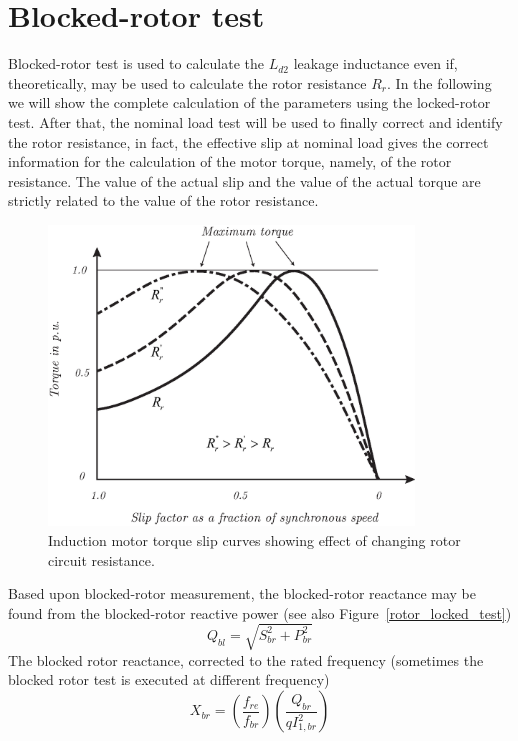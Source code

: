 \documentclass[11pt,a4paper,oneside]{book}
\numberwithin{equation}{section}
\theoremstyle{it}
\theoremstyle{definition}
\begin{document}
\section{Blocked-rotor test}
Blocked-rotor test is used to calculate the $L_{d2}$ leakage inductance even if, theoretically, may be used to calculate the rotor resistance $R_r$. 
In the following we will show the complete calculation of the parameters using the locked-rotor test. After that,  the nominal load test will be used to finally correct and identify the rotor resistance, in fact, the effective slip at nominal load gives the correct information for the calculation of the motor torque, namely, of the rotor resistance. The value of the actual slip and the value of the actual torque are strictly related to the value of the rotor resistance.
\begin{figure}[H]
	\centering
	\includegraphics[width = 275pt, keepaspectratio]{figures/rotor_res_effects_2.eps}
	\captionsetup{width=0.5\textwidth, font=small}		
	\caption{Induction motor torque slip curves showing effect of changing rotor circuit resistance.}
	\label{rotor_res_effects} 
\end{figure}
Based upon blocked-rotor measurement, the blocked-rotor reactance may be found from the blocked-rotor reactive power (see also Figure~\ref{rotor_locked_test})
\begin{equation} \label{eq19}
	Q_{bl} = \sqrt{S_{br}^2+P_{br}^2}
\end{equation} 
The blocked rotor reactance, corrected to the rated frequency (sometimes the blocked rotor test is executed at different frequency)
\begin{equation} \label{eq20}
	X_{br} = \left( \frac{f_{re}}{f_{br}}\right) \left(\frac{Q_{br}}{qI_{1,br}^2}\right)
\end{equation} 
\end{document}
